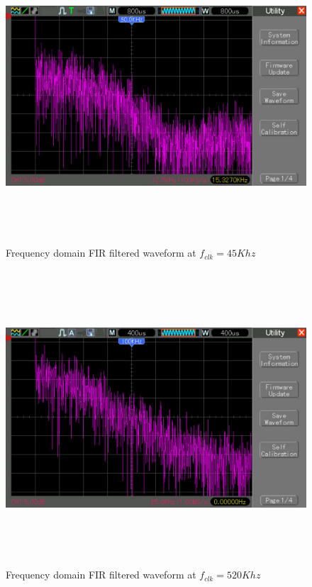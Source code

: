 \documentclass[a4paper,12pt]{article}
\begin{document}
\begin{figure}[!ht]
	\centering
	\includegraphics[width=\linewidth,height=11cm]{pic_490_1.pdf}
	\caption{Frequency domain FIR filtered waveform at $f_{clk} = 45Khz$}
	\label{fig:result-7}
\end{figure}

\begin{figure}[!ht]
	\centering
	\includegraphics[width=\linewidth,height=11cm]{pic_489_3.pdf}
	\caption{Frequency domain FIR filtered waveform at $f_{clk} = 520Khz$}
	\label{fig:result-6}
\end{figure}
\end{document}
